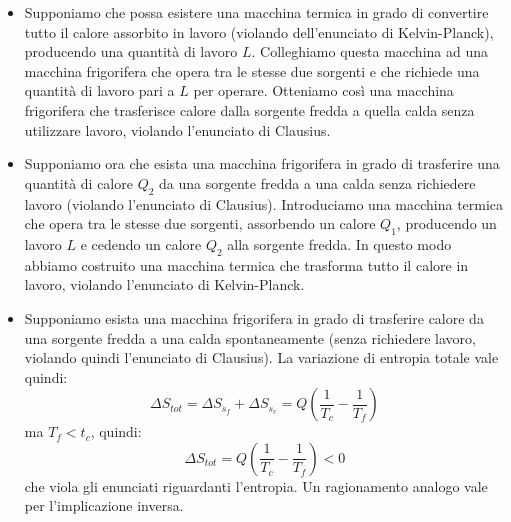 \documentclass{article}
\begin{document}
\begin{itemize}
    \item Supponiamo che possa esistere una macchina termica in grado di convertire tutto il calore assorbito in lavoro (violando dell'enunciato di Kelvin-Planck), producendo una quantità di lavoro $L$. Colleghiamo questa macchina ad una macchina frigorifera che opera tra le stesse due sorgenti e che richiede una quantità di lavoro pari a $L$ per operare. Otteniamo così una macchina frigorifera che trasferisce calore dalla sorgente fredda a quella calda senza utilizzare lavoro, violando l'enunciato di Clausius.
    \item Supponiamo ora che esista una macchina frigorifera in grado di trasferire una quantità di calore $Q_2$ da una sorgente fredda a una calda senza richiedere lavoro (violando l'enunciato di Clausius). Introduciamo una macchina termica che opera tra le stesse due sorgenti, assorbendo un calore $Q_1$, producendo un lavoro $L$ e cedendo un calore $Q_2$ alla sorgente fredda. In questo modo abbiamo costruito una macchina termica che trasforma tutto il calore in lavoro, violando l'enunciato di Kelvin-Planck.
    \item Supponiamo esista una macchina frigorifera in grado di trasferire calore da una sorgente fredda a una calda spontaneamente (senza richiedere lavoro, violando quindi l'enunciato di Clausius). La variazione di entropia totale vale quindi:
    $$ \Delta S_{tot} = \Delta S_{s_f} + \Delta S_{s_c} = Q\left( \frac{1}{T_c} - \frac{1}{T_f} \right) $$
    ma $T_f<t_c$, quindi:
    $$ \Delta S_{tot} = Q\left( \frac{1}{T_c} - \frac{1}{T_f} \right) < 0 $$
    che viola gli enunciati riguardanti l'entropia. Un ragionamento analogo vale per l'implicazione inversa.
\end{itemize}
\end{document}
